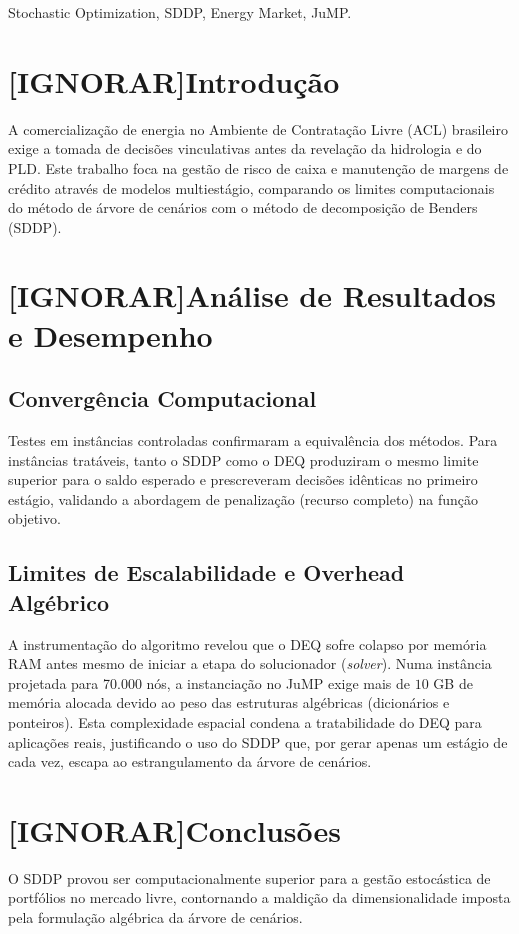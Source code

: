 \documentclass[a4paper,11pt]{article}
\begin{document}
\bigskip
\begin{keywords}
Stochastic Optimization, SDDP, Energy Market, JuMP.

\bigskip
{}
\end{keywords}

\newpage
\section{[IGNORAR]Introdução}
A comercialização de energia no Ambiente de Contratação Livre (ACL) brasileiro exige a tomada de decisões vinculativas antes da revelação da hidrologia e do PLD. Este trabalho foca na gestão de risco de caixa e manutenção de margens de crédito através de modelos multiestágio, comparando os limites computacionais do método de árvore de cenários com o método de decomposição de Benders (SDDP).




\section{[IGNORAR]Análise de Resultados e Desempenho}

\subsection{Convergência Computacional}
Testes em instâncias controladas confirmaram a equivalência dos métodos. Para instâncias tratáveis, tanto o SDDP como o DEQ produziram o mesmo limite superior para o saldo esperado e prescreveram decisões idênticas no primeiro estágio, validando a abordagem de penalização (recurso completo) na função objetivo.

\subsection{Limites de Escalabilidade e Overhead Algébrico}
A instrumentação do algoritmo revelou que o DEQ sofre colapso por memória RAM antes mesmo de iniciar a etapa do solucionador (\textit{solver}). Numa instância projetada para 70.000 nós, a instanciação no JuMP exige mais de $10$ GB de memória alocada devido ao peso das estruturas algébricas (dicionários e ponteiros). Esta complexidade espacial condena a tratabilidade do DEQ para aplicações reais, justificando o uso do SDDP que, por gerar apenas um estágio de cada vez, escapa ao estrangulamento da árvore de cenários.

\section{[IGNORAR]Conclusões}
O SDDP provou ser computacionalmente superior para a gestão estocástica de portfólios no mercado livre, contornando a maldição da dimensionalidade imposta pela formulação algébrica da árvore de cenários. 

~\\


\end{document}
